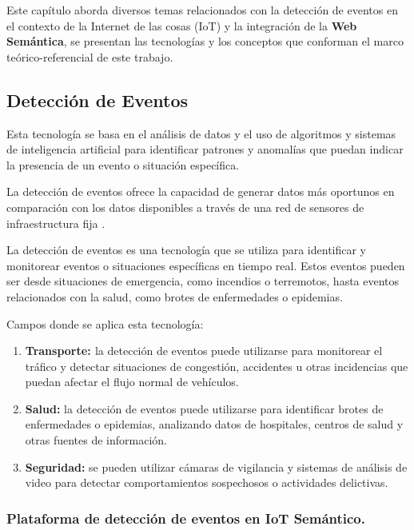 \documentclass[12pt]{article}
\begin{document}
Este capítulo aborda diversos temas relacionados con la detección de eventos en el contexto de la Internet de las cosas (IoT) y la integración de la \textbf{Web Semántica}, se presentan las tecnolog\'ias y los conceptos que conforman el marco teórico-referencial de este trabajo.

\subsection{Detección de Eventos}

Esta tecnología se basa en el análisis de datos y el uso de algoritmos y sistemas de inteligencia artificial para identificar patrones y anomalías que puedan indicar la presencia de un evento o situación específica.

La detección de eventos ofrece la capacidad de generar datos más oportunos en comparación con los datos disponibles a través de una red de sensores de infraestructura fija \citep{ref39}.

La detección de eventos es una tecnología que se utiliza para identificar y monitorear eventos o situaciones específicas en tiempo real. Estos eventos pueden ser desde situaciones de emergencia, como incendios o terremotos, hasta eventos relacionados con la salud, como brotes de enfermedades o epidemias.

Campos donde se aplica esta tecnología:

\begin{enumerate}
    \item {
        
        \textbf{Transporte: \citep{ref3} } la detección de eventos puede utilizarse para monitorear el tráfico y detectar situaciones de congestión, accidentes u otras incidencias que puedan afectar el flujo normal de vehículos.
    }
    \item {
       
        \textbf{Salud:} \citep{ref1} la detección de eventos puede utilizarse para identificar brotes de enfermedades o epidemias, analizando datos de hospitales, centros de salud y otras fuentes de información.
    }
    \item {
        \textbf{Seguridad:} \citep{ref4} se pueden utilizar cámaras de vigilancia y sistemas de análisis de video para detectar comportamientos sospechosos o actividades delictivas.
    }
\end{enumerate}




\subsubsection{Plataforma de detección de eventos en IoT Semántico.}
\end{document}
